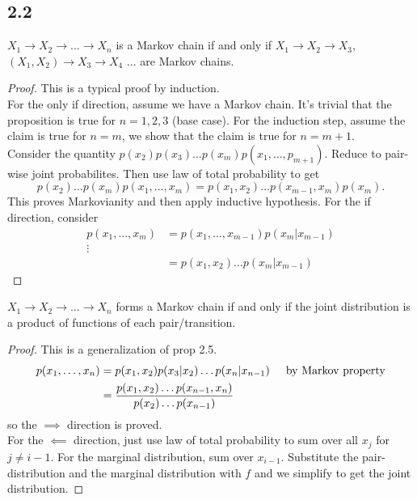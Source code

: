 \documentclass[../main.tex]{subfiles}
\begin{document}
\subsection*{2.2}
\begin{proposition*}[2.8]
    $X_1\to X_2\to...\to X_n$ is a Markov chain if and only if $X_1\to X_2\to X_3$, $(X_1,X_2)\to X_3\to X_4$ ... are Markov chains.
\end{proposition*}
\begin{proof}
    This is a typical proof by induction. \\
    For the only if direction, assume we have a Markov chain. It's trivial that the proposition is true for $n= 1, 2, 3$ (base case). For the induction step, assume the claim is true for $n=m$, we show that the claim is true for $n=m+1$.\\
    Consider the quantity $p(x_2)p(x_3)\dots p
    (x_m)p(x_1,\dots,p_{m+1})$. Reduce to pair-wise joint probabilites. Then use law of total probability to get \begin{equation*}
        p(x_2)\dots p(x_{m})p(x_1,...,x_m)=p(x_1,x_2)\dots p(x_{m-1}, x_m)p(x_m).
    \end{equation*}
    This proves Markovianity and then apply inductive hypothesis.
    For the if direction, consider \begin{align*}
        p(x_1,...,x_m) &= p(x_1,...,x_{m-1})p(x_m|x_{m-1})\\
        \vdots\\
        &=p(x_1,x_2)\dots p(x_m|x_{m-1})
    \end{align*}
\end{proof}
\begin{proposition*}[2.9]
    $X_1\to X_2\to\dots \to X_n$ forms a Markov chain if and only if the joint distribution is a product of functions of each pair/transition.
\end{proposition*}
\begin{proof}
    This is a generalization of prop 2.5. \begin{align*}
        p(x_1,\dots, x_n)
        &=p(x_1,x_2)p(x_3|x_2)\dots p(x_n|x_{n-1}) \hspace{5mm} \text{by Markov property}\\
        &=\frac{p(x_1,x_2)\dots p(x_{n-1},x_{n})}{p(x_2)\dots p(x_{n-1})}
    \end{align*}
    so the $\implies$ direction is proved.\\
    For the $\impliedby$ direction, just use law of total probability to sum over all $x_j$ for $j\neq i-1$. For the marginal distribution, sum over $x_{i-1}$. Substitute the pair-distribution and the marginal distribution with $f$ and we simplify to get the joint distribution.
\end{proof}
\end{document}
